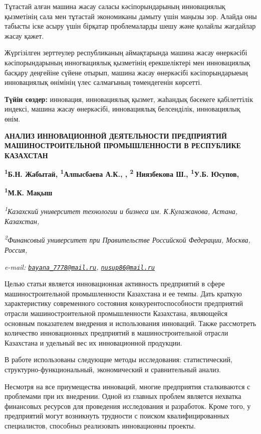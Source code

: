 {{Тұтастай алған машина жасау саласы кәсіпорындарының инновациялық
қызметінің сала мен тұтастай экономиканы дамыту үшін маңызы зор. Алайда
оны табысты іске асыру үшін бірқатар проблемаларды шешу және қолайлы
жағдайлар жасау қажет.

Жүргізілген зерттеулер республиканың аймақтарында машина жасау
өнеркәсібі кәсіпорындарының инногвациялық қызметінің ерекшеліктері мен
инновациялық басқару деңгейіне сүйене отырып, машина жасау өнеркәсібі
кәсіпорындарыеың инновациялық өнімінің үлес салмағының төмендегенін
көрсетті.

{\bfseries Түйін сөздер:} инновация, инновациялық қызмет, жаһандық бәсекеге
қабілеттілік индексі, машина жасау өнеркәсібі, инновациялық белсенділік,
инновациялық өнім.

{\bfseries АНАЛИЗ ИННОВАЦИОННОЙ ДЕЯТЕЛЬНОСТИ ПРЕДПРИЯТИЙ МАШИНОСТРОИТЕЛЬНОЙ
ПРОМЫШЛЕННОСТИ В РЕСПУБЛИКЕ КАЗАХСТАН}

{\bfseries \textsuperscript{1}Б.Н. Жабытай\textsuperscript{\envelope },
\textsuperscript{1}Алпысбаева А.К., , \textsuperscript{2} Ниязбекова Ш.,
\textsuperscript{1}У.Б. Юсупов\textsuperscript{\envelope },}

{\bfseries \textsuperscript{1}М.К. Мақыш}

\emph{\textsuperscript{1}Казахский университет технологии и бизнеса им.
К.Кулажанова, Астана, Казахстан,}

\emph{\textsuperscript{2}Финансовый университет при Правительстве
Российской Федерации, Москва, Россия,}

\emph{e-mail:
\href{mailto:bayana_7778@mail.ru}{\nolinkurl{bayana\_7778@mail.ru}},
\href{mailto:nusup86@mail.ru}{\nolinkurl{nusup86@mail.ru}}}

Целью статьи является инновационная активность предприятий в сфере
машиностроительной промышленности Казахстана и ее темпы. Дать краткую
характеристику современного состояния конкурентоспособности предприятий
отрасли машиностроительной промышленности Казахстана, являющейся
основным показателем внедрения и использования инноваций. Также
рассмотреть количество инновационных предприятий в машиностроительной
отрасли Казахстана и удельный вес их инновационной продукции.

В работе использованы следующие методы исследования: статистический,
структурно-функциональный, экономический и сравнительный анализ.

Несмотря на все приумещества инноваций, многие предприятия сталкиваются
с проблемами при их внедрении. Одной из главных проблем является
нехватка финансовых ресурсов для проведения исследования и разработок.
Кроме того, у предприятий могут возникнуть трудности с поиском
квалифицированных специалистов, способныз реализовать инновационны
проекты.

}}
